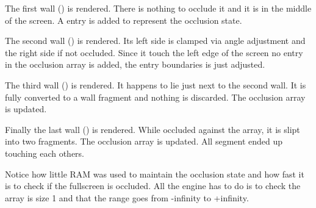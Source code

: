 The first wall () is rendered. There is nothing to occlude it and it is in the middle of the screen. A entry is added to represent the occlusion state.
\par
\begin{minipage}{0.54\textwidth}
\vspace*{2.5mm}
\end{minipage}
\begin{minipage}{0.46\textwidth}
\centering
{}
\end{minipage}
\par



The second wall () is rendered. Its left side is clamped via angle adjustment and the right side if not occluded. Since it touch the left edge of the screen no entry in the occlusion array is added, the entry boundaries is just adjusted.
\par
\begin{minipage}{0.54\textwidth}
\vspace*{2.5mm}
\end{minipage}
\begin{minipage}{0.45\textwidth}
\centering
{}
\end{minipage}
\par





The third wall () is rendered. It happens to lie just next to the second wall. It is fully converted to a wall fragment and nothing is discarded. The occlusion array is updated.
\begin{minipage}{0.54\textwidth}
\vspace*{2.5mm}
\end{minipage}
\begin{minipage}{0.46\textwidth}
\centering
{}
\end{minipage}
\par


Finally the last wall () is rendered. While occluded against the array, it is slipt into two fragments. The occlusion array is updated. All segment ended up touching each others. 
\begin{minipage}{0.54\textwidth}
\vspace*{2.5mm}
\end{minipage}
\begin{minipage}{0.46\textwidth}
\centering
{}
\end{minipage}
\par
Notice how little RAM was used to maintain the occlusion state and how fast it is to check if the fullscreen is occluded. All the engine has to do is to check the array is size 1 and that the range goes from -infinity to +infinity.


